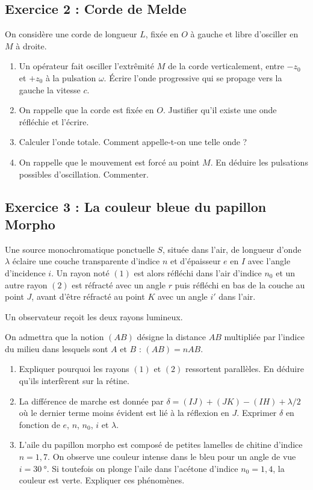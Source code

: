 \subsection{Exercice 2 : Corde de Melde}

On considère une corde de longueur $L$, fixée en $O$ à gauche et libre d'osciller en $M$ à droite.

\begin{enumerate}
	\item Un opérateur fait osciller l'extrêmité $M$ de la corde verticalement, entre $-z_0$ et $+z_0$ à la pulsation $\omega$. Écrire l'onde progressive qui se propage vers la gauche la vitesse $c$.
	\item On rappelle que la corde est fixée en $O$. Justifier qu'il existe une onde réfléchie et l'écrire.
	\item Calculer l'onde totale. Comment appelle-t-on une telle onde ?
	\item On rappelle que le mouvement est forcé au point $M$. En déduire les pulsations possibles d'oscillation. Commenter.
\end{enumerate}

\subsection{Exercice 3 : La couleur bleue du papillon Morpho}

Une source monochromatique ponctuelle $S$, située dans l'air, de longueur d'onde $\lambda$ éclaire une couche transparente d'indice $n$ et d'épaisseur $e$ en $I$ avec l'angle d'incidence $i$. Un rayon noté $(1)$ est alors réfléchi dans l'air d'indice $n_0$ et un autre rayon $(2)$ est réfracté avec un angle $r$ puis réfléchi en bas de la couche au point $J$, avant d'être réfracté au point $K$ avec un angle $i'$ dans l'air.

Un observateur reçoit les deux rayons lumineux.

On admettra que la notion $(AB)$ désigne la distance $AB$ multipliée par l'indice du milieu dans lesquels sont $A$ et $B$ : $(AB) = n AB$.

\begin{enumerate}
	\item Expliquer pourquoi les rayons $(1)$ et $(2)$ ressortent parallèles. En déduire qu'ils interfèrent sur la rétine.
	\item La différence de marche est donnée par $\delta = (IJ)+(JK)-(IH) + \lambda/2$ où le dernier terme moins évident est lié à la réflexion en $J$. Exprimer $\delta$ en fonction de $e$, $n$, $n_0$, $i$ et $\lambda$.
	\item L'aile du papillon morpho est composé de petites lamelles de chitine d'indice $n=1,7$. On observe une couleur intense dans le bleu pour un angle de vue $i=\SI{30}{\degree}$. Si toutefois on plonge l'aile dans l'acétone d'indice $n_0=1,4$, la couleur est verte. Expliquer ces phénomènes. 
\end{enumerate}
